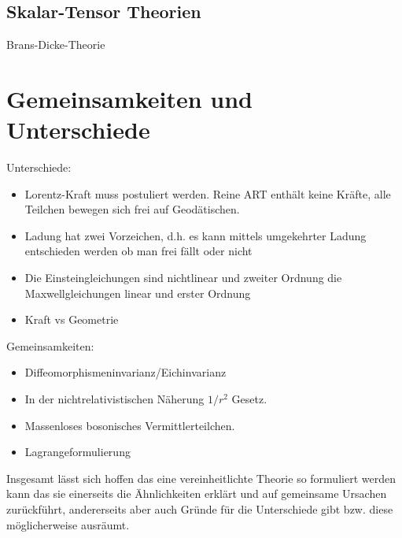 \subsection{Skalar-Tensor Theorien}
Brans-Dicke-Theorie
\section{Gemeinsamkeiten und Unterschiede}
Unterschiede:
\begin{itemize}
  	\item Lorentz-Kraft muss postuliert werden. Reine ART enthält keine Kräfte,
 	alle Teilchen bewegen sich frei auf Geodätischen.
	\item Ladung hat zwei Vorzeichen, d.h. es kann mittels umgekehrter Ladung
	entschieden werden ob man frei fällt oder nicht
	\item Die Einsteingleichungen sind nichtlinear und zweiter Ordnung die
	Maxwellgleichungen linear und erster Ordnung
	\item Kraft vs Geometrie
\end{itemize}
Gemeinsamkeiten:
\begin{itemize}
  	\item Diffeomorphismeninvarianz/Eichinvarianz
	\item In der nichtrelativistischen Näherung $1/r^2$ Gesetz.
	\item Massenloses bosonisches Vermittlerteilchen.
	\item Lagrangeformulierung
\end{itemize}
Insgesamt lässt sich hoffen das eine vereinheitlichte Theorie so formuliert
werden kann das sie einerseits die Ähnlichkeiten erklärt und auf gemeinsame
Ursachen zurückführt, andererseits aber auch Gründe für die Unterschiede gibt
bzw. diese möglicherweise ausräumt.

